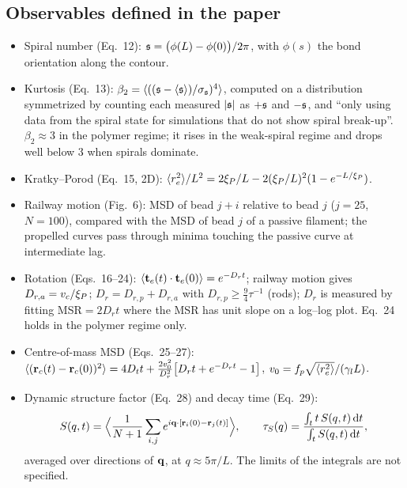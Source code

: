 \documentclass[11pt]{article}
\begin{document}
\subsection{Observables defined in the paper}
\begin{itemize}
\item Spiral number (Eq.~12): $\mathfrak{s}=\big(\phi(L)-\phi(0)\big)/2\pi$, with $\phi(s)$ the bond orientation along the contour.
\item Kurtosis (Eq.~13): $\beta_2=\langle((\mathfrak{s}-\langle\mathfrak{s}\rangle)/\sigma_{\mathfrak{s}})^4\rangle$, computed on a distribution
symmetrized by counting each measured $|\mathfrak{s}|$ as $+\mathfrak{s}$ and $-\mathfrak{s}$, and ``only using data from the spiral state for simulations
that do not show spiral break-up''. $\beta_2\approx3$ in the polymer regime; it rises in the weak-spiral regime
and drops well below 3 when spirals dominate.
\item Kratky--Porod (Eq.~15, 2D): $\langle r_e^2\rangle/L^2=2\xi_{P}/L-2(\xi_{P}/L)^2(1-e^{-L/\xi_{P}})$.
\item Railway motion (Fig.~6): MSD of bead $j+i$ relative to bead $j$ ($j=25$, $N=100$), compared with the MSD of
bead $j$ of a passive filament; the propelled curves pass through minima touching the passive curve at intermediate lag.
\item Rotation (Eqs.~16--24): $\langle\mathbf{t}_e(t)\cdot\mathbf{t}_e(0)\rangle=e^{-D_rt}$; railway motion gives
$D_{r,a}=v_c/\xi_{P}$; $D_r=D_{r,p}+D_{r,a}$ with $D_{r,p}\geq\frac94\tau^{-1}$ (rods); $D_r$ is measured by fitting
MSR$=2D_rt$ where the MSR has unit slope on a log--log plot. Eq.~24 holds in the polymer regime only.
\item Centre-of-mass MSD (Eqs.~25--27): $\langle(\mathbf{r}_c(t)-\mathbf{r}_c(0))^2\rangle=4D_tt+\frac{2v_0^2}{D_r^2}\big[D_rt+e^{-D_rt}-1\big]$,
$v_0=f_p\sqrt{\langle r_e^2\rangle}/(\gamma_{l} L)$.
\item Dynamic structure factor (Eq.~28) and decay time (Eq.~29):
\begin{equation}
S(q,t)=\Big\langle\frac{1}{N+1}\sum_{i,j}e^{i\mathbf{q}\cdot[\mathbf{r}_i(0)-\mathbf{r}_j(t)]}\Big\rangle,\qquad
\tau_S(q)=\frac{\int_t t\,S(q,t)\,\mathrm{d} t}{\int_t S(q,t)\,\mathrm{d} t},
\end{equation}
averaged over directions of $\mathbf{q}$, at $q\approx5\pi/L$. The limits of the integrals are not specified.
\end{itemize}
\end{document}
